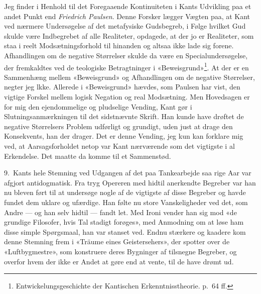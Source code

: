 \documentclass[12pt,a4paper]{article}
\begin{document}
Jeg finder i Henhold til det Foregaaende Kontinuiteten i Kants Udvikling
paa et andet Punkt end \emph{Friedrich Paulsen}. Denne Forsker lægger Vægten
paa, at Kant ved nærmere Undersøgelse af det metafysiske Gudsbegreb, i
Følge hvilket Gud skulde være Indbegrebet af alle Realiteter, opdagede,
at der jo er Realiteter, som staa i reelt Modsætningsforhold til
hinanden og altsaa ikke lade sig forene. Afhandlingen om de negative
Størrelser skulde da være en Specialundersøgelse, der fremkaldtes ved de
teologiske Betragtninger i
«Beweisgrund»\footnote{Entwickelungsgeschichte der Kantischen
Erkenntnisstheorie. p.\ 64 ff.}. At der er en Sammenhæng mellem
«Beweisgrund» og Afhandlingen om de negative Størrelser, negter jeg lkke.
Allerede i «Beweisgrund» hævdes, som Paulsen har vist, den vigtige
Forskel mellem logisk Negation og real Modsætning. Men Hovedsagen er for
mig den ejendommelige og pludselige Vending, Kant gør i
Slutningsanmærkningen til det sidstnævnte Skrift. Han kunde have drøftet
de negative Størrelsers Problem udførligt og grundigt, uden just at drage
den Konsekvents, han der drager. Det er denne Vending, jeg kun kan
forklare mig ved, at Aarsagsforholdet netop var Kant nærværende som det
vigtigste i al Erkendelse. Det maatte da komme til et Sammenstød.

9.\ Kants hele Stemning ved Udgangen af det paa Tankearbejde saa rige Aar
var afgjort antidogmatisk. Fra tryg Opereren med hidtil anerkendte
Begreber var han nu bleven ført til at undersøge nogle af de vigtigste af
disse Begreber og havde fundet dem uklare og ufærdige. Han følte nu store
Vanskeligheder ved det, som Andre --- og han selv hidtil --- fandt let.
Med Ironi vender han sig mod «de grundige Filosofer, hvis Tal stadigt
forøges», med Anmodning om at løse ham disse simple Spørgsmaal, han var
stanset ved. Endnu stærkere og kaadere kom denne Stemning frem i «Träume
eines Geistersehers», der spotter over de «Luftbygmestre», som konstruere
deres Bygninger af tilsnegne Begreber, og overfor hvem der ikke er Andet
at gøre end at vente, til de have drømt ud.
\end{document}
